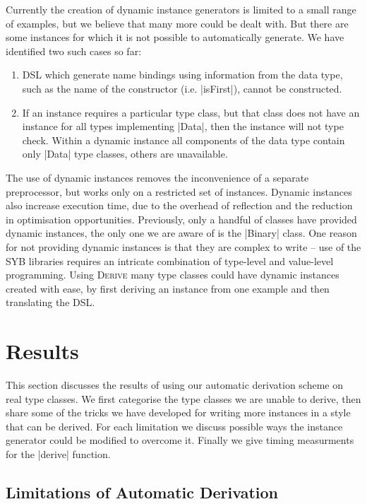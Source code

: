 \documentclass[preprint,draft]{sigplanconf}
\newcommand{\derive}{\textsc{Derive}}
\begin{document}
Currently the creation of dynamic instance generators is limited to a small range of examples, but we believe that many more could be dealt with. But there are some instances for which it is not possible to automatically generate. We have identified two such cases so far:

\begin{enumerate}
\item DSL which generate name bindings using information from the data type, such as the name of the constructor (i.e. |isFirst|), cannot be constructed.
\item If an instance requires a particular type class, but that class does not have an instance for all types implementing |Data|, then the instance will not type check. Within a dynamic instance all components of the data type contain only |Data| type classes, others are unavailable.
\end{enumerate}

The use of dynamic instances removes the inconvenience of a separate preprocessor, but works only on a restricted set of instances. Dynamic instances also increase execution time, due to the overhead of reflection and the reduction in optimisation opportunities. Previously, only a handful of classes have provided dynamic instances, the only one we are aware of is the |Binary| class. One reason for not providing dynamic instances is that they are complex to write -- use of the SYB libraries requires an intricate combination of type-level and value-level programming. Using \derive{} many type classes could have dynamic instances created with ease, by first deriving an instance from one example and then translating the DSL.

\section{Results}
\label{sec:results}

This section discusses the results of using our automatic derivation scheme on real type classes. We first categorise the type classes we are unable to derive, then share some of the tricks we have developed for writing more instances in a style that can be derived. For each limitation we discuss possible ways the instance generator could be modified to overcome it. Finally we give timing measurments for the |derive| function.

\subsection{Limitations of Automatic Derivation}
\label{sec:failure}
\end{document}
